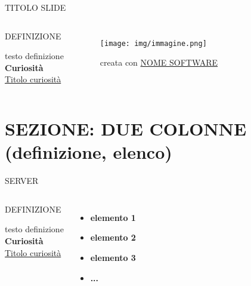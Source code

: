 \documentclass[aspectratio=1610]{beamer}
\begin{document}
\begin{frame}{TITOLO SLIDE}
    \begin{columns}
            \begin{alertblock}{DEFINIZIONE}
                \begin{minipage}{0.96\linewidth}
                    \justifying
                    testo definizione\\
                    \bigskip
                    \tiny{\textbf{Curiosità}}\\
                    \tiny{\href{www.link.com}{Titolo curiosità}}
                \end{minipage}
            \end{alertblock}
            \begin{figure}
                \texttt{[image: img/immagine.png]}
                \caption{{creata con \href{www.link.com}{NOME SOFTWARE}}}
            \end{figure}
    \end{columns}
\end{frame}

\section{SEZIONE: DUE COLONNE (definizione, elenco)}

\begin{frame}{SERVER}
    \begin{columns}
            \begin{alertblock}{DEFINIZIONE}
                \begin{minipage}{0.96\linewidth}
                    \justifying
                    testo definizione\\ 
                    \tiny{\textbf{Curiosità}}\\
                    \tiny{\href{www.link.com}{Titolo curiosità}}
                \end{minipage}
            \end{alertblock}
            \begin{itemize}
                \item \textbf{elemento 1}
                \item \textbf{elemento 2}
                \item \textbf{elemento 3}
                \item \textbf{...}
            \end{itemize}
    \end{columns}
\end{frame}
\end{document}
